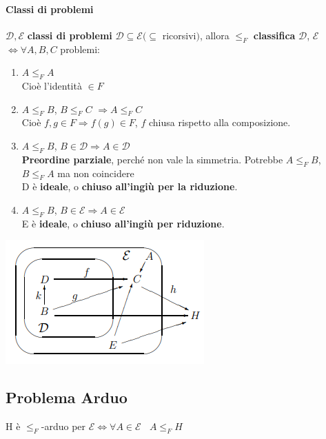 \documentclass[10pt]{book}
\begin{document}
\paragraph{Classi di problemi} $\mathscr{D}, \mathscr{E}$ \textbf{classi di problemi} $\mathscr{D} \subseteq \mathscr{E} (\subseteq$ ricorsivi$)$, allora $\leq_F$ \textbf{classifica} $\mathscr{D}$, $\mathscr{E}$ $\Leftrightarrow \forall A, B, C$ problemi:
\begin{multicols}{2}
\begin{enumerate}
	\item $A \leq_F A$\\ Cioè l'identità $\in F$
	\item $A \leq_F B$, $B \leq_F C$ $\Rightarrow A \leq_F C$\\ Cioè $f, g \in F \Rightarrow f(g) \in F$, $f$ chiusa rispetto alla composizione.
	\item $A \leq_F B$, $B \in \mathscr{D} \Rightarrow A \in \mathscr{D}$\\
	\textbf{Preordine parziale}, perché non vale la simmetria. Potrebbe $A \leq_F B$, $B \leq_F A$ ma non coincidere\\
	D è \textbf{ideale}, o \textbf{chiuso all'ingiù per la riduzione}.
	\item $A \leq_F B$, $B \in \mathscr{E} \Rightarrow A \in \mathscr{E}$\\
	E è \textbf{ideale}, o \textbf{chiuso all'ingiù per riduzione}.
\end{enumerate}
\begin{center}
	\includegraphics[scale=1]{1.png}
\end{center}
\end{multicols}
\subsection{Problema Arduo}
H è $\leq_F$-arduo per $\mathscr{E} \Leftrightarrow \forall A \in \mathscr{E}\:\:\:\: A \leq_F H$
\end{document}
